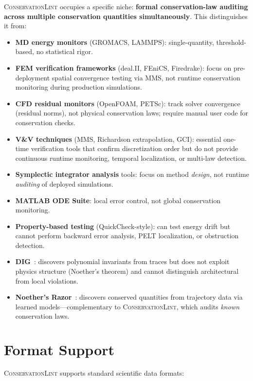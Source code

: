 \documentclass[11pt,a4paper]{article}
\begin{document}
\textsc{ConservationLint} occupies a specific niche: \textbf{formal conservation-law auditing across multiple conservation quantities simultaneously}. This distinguishes it from:

\begin{itemize}
    \item \textbf{MD energy monitors} (GROMACS, LAMMPS): single-quantity, threshold-based, no statistical rigor.
    \item \textbf{FEM verification frameworks} (deal.II, FEniCS, Firedrake): focus on pre-deployment spatial convergence testing via MMS, not runtime conservation monitoring during production simulations.
    \item \textbf{CFD residual monitors} (OpenFOAM, PETSc): track solver convergence (residual norms), not physical conservation laws; require manual user code for conservation checks.
    \item \textbf{V\&V techniques} (MMS, Richardson extrapolation, GCI): essential one-time verification tools that confirm discretization order but do not provide continuous runtime monitoring, temporal localization, or multi-law detection.
    \item \textbf{Symplectic integrator analysis} tools: focus on method \emph{design}, not runtime \emph{auditing} of deployed simulations.
    \item \textbf{MATLAB ODE Suite}: local error control, not global conservation monitoring.
    \item \textbf{Property-based testing} (QuickCheck-style): can test energy drift but cannot perform backward error analysis, PELT localization, or obstruction detection.
    \item \textbf{DIG}~\citep{nguyen2012}: discovers polynomial invariants from traces but does not exploit physics structure (Noether's theorem) and cannot distinguish architectural from local violations.
    \item \textbf{Noether's Razor}~\citep{cranmer2024}: discovers conserved quantities from trajectory data via learned models---complementary to \textsc{ConservationLint}, which audits \emph{known} conservation laws.
\end{itemize}

\section{Format Support}
\label{sec:formats}

\textsc{ConservationLint} supports standard scientific data formats:
\end{document}
